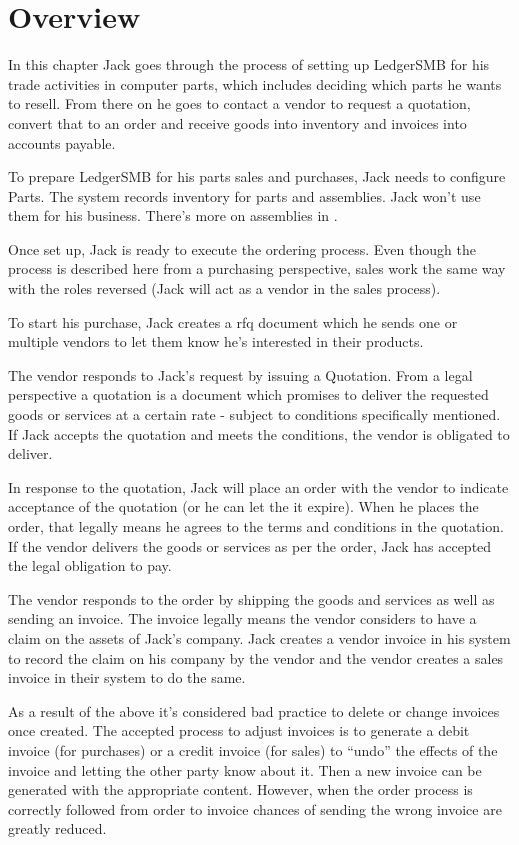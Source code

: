 \section{Overview}
\label{sec-stock-overview}

In this chapter Jack goes through the process of setting up LedgerSMB for his
trade activities in computer parts, which includes deciding which parts he wants to
resell. From there on he goes to contact a vendor to request a quotation, convert that
to an order and receive goods into inventory and invoices into accounts payable.

To prepare LedgerSMB for his parts sales and purchases, Jack needs to configure Parts.
The system records inventory for parts and assemblies. Jack won't use them for his
business. There's more on assemblies in .

Once set up, Jack is ready to execute the ordering process. Even though the process
is described here from a purchasing perspective, sales work the same way with the roles
reversed (Jack will act as a vendor in the sales process).

To start his purchase, Jack creates a \gls{rfq} document which
he sends one or multiple vendors to let them know he's interested in their products.

The vendor responds to Jack's request by issuing a Quotation. From a legal perspective
a quotation is a document which promises to deliver the requested goods or services at a
certain rate - subject to conditions specifically mentioned. If Jack accepts the quotation
and meets the conditions, the vendor is obligated to deliver.

In response to the quotation, Jack will place an order with the vendor to indicate
acceptance of the quotation (or he can let the
it expire). When he places the order, that legally means he agrees to the terms
and conditions in the quotation. If the vendor delivers the goods or services as per the
order, Jack has accepted the legal obligation to pay.

The vendor responds to the order by shipping the goods and services as well
as sending an invoice. The invoice legally means the vendor considers to have a claim on the assets
of Jack's company. Jack creates a vendor invoice in his system to record the claim on his
company by the vendor and the vendor creates a sales invoice in their system to do the same.

As a result of the above it's considered bad practice to delete or change invoices once
created. The accepted process to adjust invoices is to generate a debit invoice (for purchases)
or a credit invoice (for sales) to ``undo'' the effects of the invoice and letting the other party
know about it. Then a new invoice can be generated with the appropriate content. However,
when the order process is correctly followed from order to invoice chances of sending the wrong
invoice are greatly reduced.

